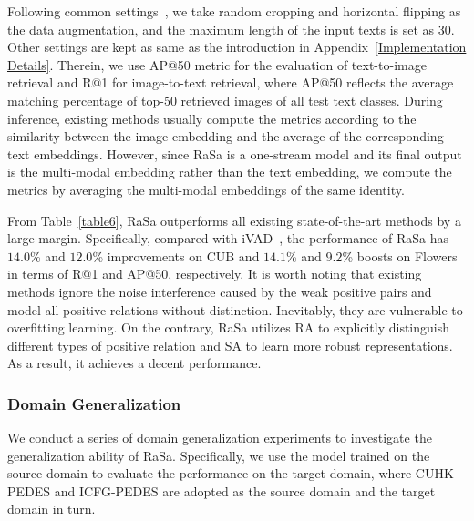 \documentclass{article}
\begin{document}
Following common settings~\cite{reed2016learning,sarafianos2019adversarial}, we take random cropping and horizontal flipping as the data augmentation, and the maximum length of the input texts is set as $30$.
Other settings are kept as same as the introduction in Appendix~\ref{Implementation Details}.
Therein, we use AP@50 metric for the evaluation of text-to-image retrieval and R@1 for image-to-text retrieval, where AP@50 reflects the average matching percentage of top-50 retrieved images of all test text classes.
During inference, existing methods usually compute the metrics according to the similarity between the image embedding and the average of the corresponding text embeddings.
However, since RaSa is a one-stream model and its final output is the multi-modal embedding rather than the text embedding, we compute the metrics by averaging the multi-modal embeddings of the same identity.


From Table~\ref{table6}, RaSa outperforms all existing state-of-the-art methods by a large margin.
Specifically, compared with iVAD~\cite{wang2022improving}, the performance of RaSa has $14.0$\% and $12.0$\% improvements on CUB and $14.1$\% and $9.2$\% boosts on Flowers in terms of R@1 and AP@50, respectively.
It is worth noting that existing methods ignore the noise interference caused by the weak positive pairs and model all positive relations without distinction.
Inevitably, they are vulnerable to overfitting learning.
On the contrary, RaSa utilizes RA to explicitly distinguish different types of positive relation and SA to learn more robust representations.
As a result, it achieves a decent performance.


\subsubsection{Domain Generalization}
We conduct a series of domain generalization experiments to investigate the generalization ability of RaSa.
Specifically, we use the model trained on the source domain to evaluate the performance on the target domain, where CUHK-PEDES and ICFG-PEDES are adopted as the source domain and the target domain in turn.
\end{document}
